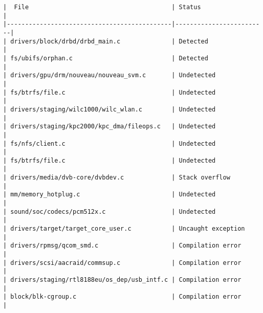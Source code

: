 \begin{verbatim}
|  File                                       | Status                  | 
|---------------------------------------------|-------------------------|
| drivers/block/drbd/drbd_main.c              | Detected                | 
| fs/ubifs/orphan.c                           | Detected                | 
| drivers/gpu/drm/nouveau/nouveau_svm.c       | Undetected              | 
| fs/btrfs/file.c                             | Undetected              | 
| drivers/staging/wilc1000/wilc_wlan.c        | Undetected              | 
| drivers/staging/kpc2000/kpc_dma/fileops.c   | Undetected              | 
| fs/nfs/client.c                             | Undetected              | 
| fs/btrfs/file.c                             | Undetected              | 
| drivers/media/dvb-core/dvbdev.c             | Stack overflow          | 
| mm/memory_hotplug.c                         | Undetected              | 
| sound/soc/codecs/pcm512x.c                  | Undetected              | 
| drivers/target/target_core_user.c           | Uncaught exception      | 
| drivers/rpmsg/qcom_smd.c                    | Compilation error       | 
| drivers/scsi/aacraid/commsup.c              | Compilation error       | 
| drivers/staging/rtl8188eu/os_dep/usb_intf.c | Compilation error       | 
| block/blk-cgroup.c                          | Compilation error       | 
\end{verbatim}